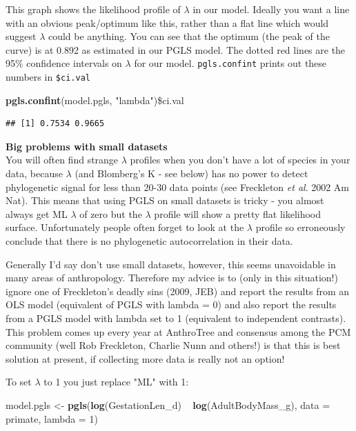 \documentclass[12pt]{article}
\newcommand{\KeywordTok}[1]{\textcolor[rgb]{0.13,0.29,0.53}{\textbf{{#1}}}}
\newcommand{\DataTypeTok}[1]{\textcolor[rgb]{0.13,0.29,0.53}{{#1}}}
\newcommand{\StringTok}[1]{\textcolor[rgb]{0.31,0.60,0.02}{{#1}}}
\newcommand{\NormalTok}[1]{{#1}}
\begin{document}
This graph shows the likelihood profile of $\lambda$ in our model. Ideally you want a line with an obvious peak/optimum like this, rather than a flat line which would suggest $\lambda$ could be anything. You can see that the optimum (the peak of the curve) is at 0.892 as estimated in our PGLS model. The dotted red lines are the 95\% confidence intervals on $\lambda$ for our model. \texttt{pgls.confint} prints out these numbers in \texttt{\$ci.val}

\begin{snugshade}
\begin{Highlighting}[]
\KeywordTok{pgls.confint}\NormalTok{(model.pgls, }\StringTok{"lambda"}\NormalTok{)}\NormalTok{\$ci.val}
\end{Highlighting}
\end{snugshade}

\begin{verbatim}
## [1] 0.7534 0.9665
\end{verbatim}

\begin{framed}
\textbf{Big problems with small datasets}\\

You will often find strange $\lambda$ profiles when you don't have a lot of species in your data, because $\lambda$ (and Blomberg's K - see below) has no power to detect phylogenetic signal for less than 20-30 data points (see Freckleton \textit{et al}. 2002 Am Nat). This means that using PGLS on small datasets is tricky - you almost always get ML $\lambda$ of zero but the $\lambda$ profile will show a pretty flat likelihood surface. Unfortunately people often forget to look at the $\lambda$ profile so erroneously conclude that there is no phylogenetic autocorrelation in their data.

Generally I'd say don't use small datasets, however, this seems unavoidable in many areas of anthropology. Therefore my advice is to (only in this situation!) ignore one of Freckleton's deadly sins (2009, JEB) and report the results from an OLS model (equivalent of PGLS with lambda = 0) and also report the results from a PGLS model with lambda set to 1 (equivalent to independent contrasts). This problem comes up every year at AnthroTree and consensus among the PCM community (well Rob Freckleton, Charlie Nunn and others!) is that this is best solution at present, if collecting more data is really not an option!

To set $\lambda$ to 1 you just replace "ML" with 1:

\begin{snugshade}
\begin{Highlighting}[]
\NormalTok{model.pgls <-}\StringTok{ }\KeywordTok{pgls}\NormalTok{(}\KeywordTok{log}\NormalTok{(GestationLen_d) ~}\StringTok{ }\KeywordTok{log}\NormalTok{(AdultBodyMass_g), }
                   \DataTypeTok{data =} \NormalTok{primate, }\DataTypeTok{lambda =} \StringTok{1}\NormalTok{)}
\end{Highlighting}
\end{snugshade}
\end{framed}
\end{document}
